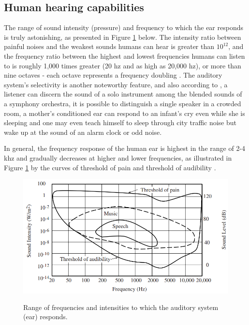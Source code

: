 \subsection{Human hearing capabilities}
\label{subsec:microphones_Human_hearing_capabilities}

The range of sound intensity (pressure) and frequency to which the ear responds is truly astonishing, as presented in Figure \ref{fig:frmwk_microphone_human_hearing} below. The intensity ratio between painful noises and the weakest sounds humans can hear is greater than $10^{12}$, and the frequency ratio between the highest and lowest frequencies humans can listen to is roughly 1,000 times greater (20 \gls{hz} and as high as 20,000 \gls{hz}), or more than nine octaves - each octave represents a frequency doubling \cite{Rossing2013}. The auditory system's selectivity is another noteworthy feature, and also according to \textcite{Rossing2013}, a listener can discern the sound of a solo instrument among the blended sounds of a symphony orchestra, it is possible to distinguish a single speaker in a crowded room, a mother's conditioned ear can respond to an infant's cry even while she is sleeping and one may even teach himself to sleep through city traffic noise but wake up at the sound of an alarm clock or odd noise.

In general, the frequency response of the human ear is highest in the range of 2-4 \gls{k}\gls{hz} and gradually decreases at higher and lower frequencies, as illustrated in Figure \ref{fig:frmwk_microphone_human_hearing} by the curves of threshold of pain and threshold of audibility \cite{Moore2013}.

\begin{figure}[htbp]
    \raggedright
        \caption{Range of frequencies and intensities to which the auditory system (ear) responds.}
        \includegraphics[width=1\textwidth]{resources/images/030-theoretical_framework/Framework_microphone_human_hearing.png}
        \label{fig:frmwk_microphone_human_hearing}
\end{figure}


